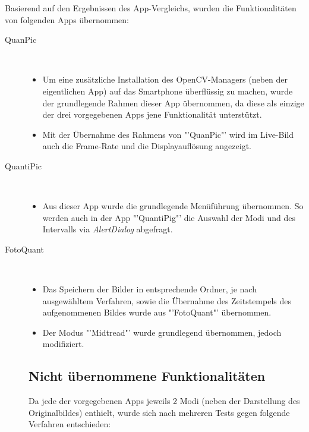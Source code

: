 Basierend auf den Ergebnissen des App-Vergleichs, wurden die Funktionalitäten von folgenden Apps übernommen:
\begin{description}
\item[QuanPic]~\par
\begin{itemize}
\item Um eine zusätzliche Installation des OpenCV-Managers (neben der eigentlichen App) auf das Smartphone überflüssig zu machen, wurde der grundlegende Rahmen dieser App übernommen, da diese als einzige der drei vorgegebenen Apps jene Funktionalität unterstützt.
\item Mit der Übernahme des Rahmens von "'QuanPic"' wird im Live-Bild auch die Frame-Rate und die Displayauflösung angezeigt.
\end{itemize}

\item[QuantiPic]~\par
\begin{itemize}
\item Aus dieser App wurde die grundlegende Menüführung übernommen. So werden auch in der App "'QuantiPig"' die Auswahl der Modi und des Intervalls via \textit{AlertDialog} abgefragt.
\end{itemize}

\item[FotoQuant]~\par
\begin{itemize}
\item Das Speichern der Bilder in entsprechende Ordner, je nach ausgewähltem Verfahren, sowie die Übernahme des Zeitstempels des aufgenommenen Bildes wurde aus "'FotoQuant"' übernommen.
\item Der Modus "'Midtread"' wurde grundlegend übernommen, jedoch modifiziert.
\end{itemize}


\subsection{Nicht übernommene Funktionalitäten}

Da jede der vorgegebenen Apps jeweils 2 Modi (neben der Darstellung des Originalbildes) enthielt, wurde sich nach mehreren Tests gegen folgende Verfahren entschieden:


\end{description}
